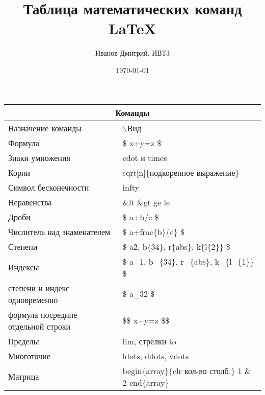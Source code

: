\documentclass[a4paper,12pt]{article} %
\author{Иванов Дмитрий, ИВТ3}
\title{Таблица математических команд \LaTeX{}}
\date{\today}
\begin{document}
\maketitle
\newpage


\flushleft
\begin{tabular}{|l|l|}
  \hline
  \multicolumn{2}{|c|}{Команды} \\
  \hline
  Назначение команды & $\backslash$Вид \\
  \hline
  Формула  & \$ x+y=z \$ \\
  \hline
  Знаки умножения  & cdot и times  \\
  \hline
  Корни  &  sqrt[n]\{подкоренное выражение\} \\
  \hline
   Символ бесконечности  &  infty \\
   \hline
   Неравенства  & \&lt \&gt ge le\\
   \hline
    Дроби & \$ a+b/c \$ \\
   \hline
  Числитель над знаменателем  & \$ a+frac\{b\}\{c\} \$  \\
  \hline
  Степени & \$ a\^2, b\^\{34\}, r\^ \{abs\}, k\^ \{l\^ \{2\}\} \$ \\
  \hline
  Индексы & \$ a\_1, b\_\{34\}, r\_\{abs\}, k\_\{l\_\{1\}\} \$ \\
  \hline
  степени и индекс одновременно & \$ a\_3\^2  \$ \\
  \hline
  формула посредине отдельной строки & \$\$ x+y=z \$\$ \\
  \hline
  Пределы  & lim, стрелки to\\
  \hline
  Многоточие  & ldots, ddots, vdots\\
  \hline
  Матрица  &  begin\{array\}\{clr кол-во столб.\} 1 \& 2 end\{array\}  \\
  \hline
\end{tabular}
\end{document}
